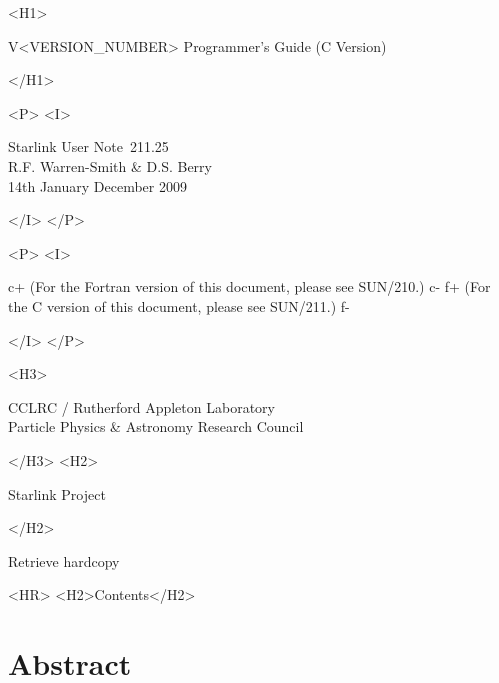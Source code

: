 \documentclass[twoside,11pt]{article}
\newcommand{\stardoccategory}  {Starlink User Note}
\newcommand{\stardocsource}    {sun\stardocnumber}
\newcommand{\stardocnumber}    {211.25}
\newcommand{\stardocnumber}    {210.25}
\newcommand{\stardocauthors}   {R.F. Warren-Smith \& D.S. Berry}
\newcommand{\stardocdate}      {14th January December 2009}
\newcommand{\stardocversion}   {V<VERSION_NUMBER>}
\newcommand{\stardocmanualhtml}{Programmer's Guide (C Version)}
\newcommand{\stardocmanualhtml}{Programmer's Guide (Fortran Version)}
\newcommand{\htmladdnormallink}[2]{#1}
\newcommand{\htmladdimg}[1]{}
\newcommand{\htmlref}[2]{#1}
\newcommand{\htmladdtonavigation}[1]{}
\newcommand{\xref}[3]{#1}
\newcommand{\xlabel}[1]{}
\begin{document}
\begin{htmlonly}
   \begin{rawhtml} <H1> \end{rawhtml}
      \stardocversion
      \stardocmanualhtml
   \begin{rawhtml} </H1> \end{rawhtml}
   \begin{rawhtml} <P> <I> \end{rawhtml}
   \stardoccategory\ \stardocnumber \\
   \stardocauthors \\
   \stardocdate
   \begin{rawhtml} </I> </P> \end{rawhtml}
   \begin{rawhtml} <P> <I> \end{rawhtml}
c+
   (For the Fortran version of this document, please see
    \xref{SUN/210}{sun210}{}.)
c-
f+
   (For the C version of this document, please see \xref{SUN/211}{sun211}{}.)
f-
   \begin{rawhtml} </I> </P> \end{rawhtml}
   \begin{rawhtml} <H3> \end{rawhtml}
      \htmladdnormallink{CCLRC}{http://www.cclrc.ac.uk} /
      \htmladdnormallink{Rutherford Appleton Laboratory}
                        {http://www.cclrc.ac.uk/ral} \\
      \htmladdnormallink{Particle Physics \& Astronomy Research Council}
                        {http://www.pparc.ac.uk} \\
   \begin{rawhtml} </H3> <H2> \end{rawhtml}
      \htmladdnormallink{Starlink Project}{http://www.starlink.rl.ac.uk/}
   \begin{rawhtml} </H2> \end{rawhtml}
   \htmladdnormallink{\htmladdimg{source.gif} Retrieve hardcopy}
      {http://www.starlink.rl.ac.uk/cgi-bin/hcserver?\stardocsource}\\

  \label{stardoccontents}
  \begin{rawhtml} 
    <HR>
    <H2>Contents</H2>
  \end{rawhtml}
  \htmladdtonavigation{\htmlref{\htmladdimg{contents_motif.gif}}
        {stardoccontents}}

  \section{\xlabel{abstract}Abstract}
\end{htmlonly}
\end{document}
